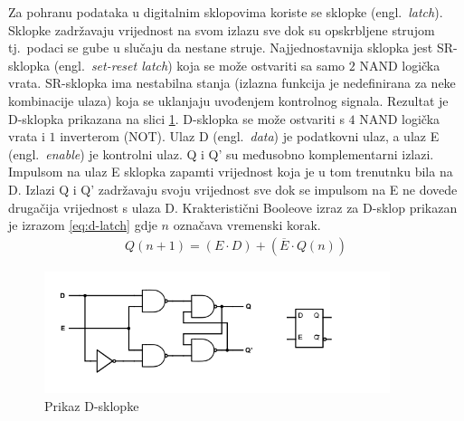 \documentclass[times, utf8, diplomski]{fer}
\begin{document}
Za pohranu podataka u digitalnim sklopovima koriste se sklopke (engl.~\textit{latch}). Sklopke zadržavaju vrijednost na svom izlazu sve dok su opskrbljene strujom tj.~podaci se gube u slučaju da nestane struje. Najjednostavnija sklopka jest SR-sklopka (engl.~\textit{set-reset latch}) koja se može ostvariti sa samo $2$ NAND logička vrata. SR-sklopka ima nestabilna stanja (izlazna funkcija je nedefinirana za neke kombinacije ulaza) koja se uklanjaju uvođenjem kontrolnog signala. Rezultat je D-sklopka prikazana na slici \ref{fig:D-latch}. D-sklopka se može ostvariti s $4$ NAND logička vrata i $1$ inverterom (NOT). Ulaz D (engl.~\textit{data}) je podatkovni ulaz, a ulaz E (engl.~\textit{enable}) je kontrolni ulaz. Q i Q' su međusobno komplementarni izlazi. Impulsom na ulaz E sklopka zapamti vrijednost koja je u tom trenutnku bila na D. Izlazi Q i Q' zadržavaju svoju vrijednost sve dok se impulsom na E ne dovede drugačija vrijednost s ulaza D. Krakteristični Booleove izraz za D-sklop prikazan je izrazom \ref{eq:d-latch} gdje $n$ označava vremenski korak.
%
\begin{gather}
	\label{eq:d-latch}
	Q(n+1)=(E \cdot D) + (\overline{E} \cdot Q(n))
\end{gather}

\begin{figure}[htb]
	\centering
	\includegraphics[width=0.9\textwidth]{img/D-latch_full.png}
	\caption{Prikaz D-sklopke}
	\label{fig:D-latch}
\end{figure}

\end{document}
